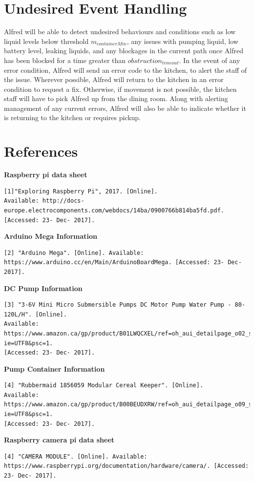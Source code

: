 \documentclass [10pt]{article}
\begin{document}
\section{Undesired Event Handling}
Alfred will be able to detect undesired behaviours and conditions such as low liquid levels below threshold $ m_{containerMin} $, any issues with pumping liquid, low battery level, leaking liquids, and any blockages in the current path once Alfred has been blocked for a time greater than $ obstruction_{timeout} $. In the event of any error condition, Alfred will send an error code to the kitchen, to alert the staff of the issue. Wherever possible, Alfred will return to the kitchen in an error condition to request a fix. Otherwise, if movement is not possible, the kitchen staff will have to pick Alfred up from the dining room. Along with alerting management of any current errors, Alfred will also be able to indicate whether it is returning to the kitchen or requires pickup.


\section{References}


\textbf{Raspberry pi data sheet}
\begin{verbatim}
[1]"Exploring Raspberry Pi", 2017. [Online]. 
Available: http://docs-europe.electrocomponents.com/webdocs/14ba/0900766b814ba5fd.pdf. 
[Accessed: 23- Dec- 2017].
\end{verbatim}

\textbf{Arduino Mega Information}
\begin{verbatim}
[2] "Arduino Mega". [Online]. Available:
https://www.arduino.cc/en/Main/ArduinoBoardMega. [Accessed: 23- Dec- 2017].
\end{verbatim}

\textbf{DC Pump Information}
\begin{verbatim}
[3] "3-6V Mini Micro Submersible Pumps DC Motor Pump Water Pump - 80-120L/H". [Online]. 
Available: 
https://www.amazon.ca/gp/product/B01LWQCXEL/ref=oh_aui_detailpage_o02_s00?ie=UTF8&psc=1.
[Accessed: 23- Dec- 2017].
\end{verbatim}
\textbf{Pump Container Information}
\begin{verbatim}
[4] "Rubbermaid 1856059 Modular Cereal Keeper". [Online]. 
Available: 
https://www.amazon.ca/gp/product/B00BEUDXRW/ref=oh_aui_detailpage_o09_s00?ie=UTF8&psc=1. 
[Accessed: 23- Dec- 2017].
\end{verbatim}

\textbf{Raspberry camera pi data sheet}
\begin{verbatim}
[4] "CAMERA MODULE". [Online]. Available:
https://www.raspberrypi.org/documentation/hardware/camera/. [Accessed: 23- Dec- 2017].
\end{verbatim}
\end{document}
